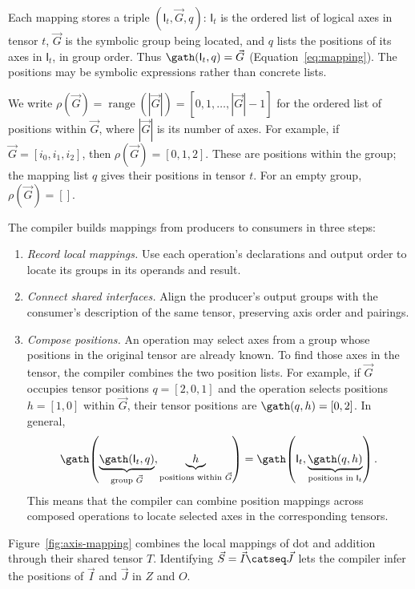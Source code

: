 Each mapping stores a triple $(\mathsf{I}_t,\vec G,q)$: $\mathsf{I}_t$ is
the ordered list of logical axes in tensor $t$, $\vec G$ is the symbolic group
being located, and $q$ lists the positions of its axes in $\mathsf{I}_t$,
in group order. Thus
$\gath(\mathsf{I}_t,q)=\vec G$ (Equation~\eqref{eq:mapping}).
The positions may be symbolic expressions rather than concrete lists.

We write $\rho(\vec G)=\operatorname{range}(|\vec G|)=[0,1,\ldots,|\vec G|-1]$ for
the ordered list of positions within $\vec G$, where $|\vec G|$ is its number of axes.
For example, if $\vec G=[i_0,i_1,i_2]$, then $\rho(\vec G)=[0,1,2]$.
These are positions within the group; the mapping list $q$ gives their
positions in tensor $t$. For an empty group, $\rho(\vec G)=[]$.

The compiler builds mappings from producers to consumers in three steps:
\begin{enumerate}
\item \emph{Record local mappings.}
Use each operation's  declarations and output order to locate
its groups in its operands and result.
\item \emph{Connect shared interfaces.}
Align the producer's output groups with the consumer's description of
the same tensor, preserving axis order and pairings.
\item \emph{Compose positions.}
An operation may select axes from a group whose positions in the original
tensor are already known. To find those axes in the tensor, the compiler
combines the two position lists. For example, if $\vec G$ occupies tensor
positions $q=[2,0,1]$ and the operation selects positions $h=[1,0]$
within $\vec G$, their tensor positions are $\gath(q,h)=[0,2]$.
In general,
\begin{equation}
 \gath\!\left(
   \underbrace{\gath(\mathsf{I}_t,q)}_{\text{group }\vec G},
   \underbrace{h}_{\text{positions within }\vec G}
 \right)
 =
 \gath\!\left(
   \mathsf{I}_t,
   \underbrace{\gath(q,h)}_{\text{positions in }\mathsf{I}_t}
 \right).
 \label{eq:gather-composition}
\end{equation}
This means that the compiler can combine position mappings across composed
operations to locate selected axes in the corresponding tensors.
\end{enumerate}

Figure~\ref{fig:axis-mapping} combines the local mappings of dot and
addition through their shared tensor $T$. Identifying $\vec S=\vec I\catseq\vec J$
lets the compiler infer the positions of $\vec I$ and $\vec J$ in $Z$ and $O$.

